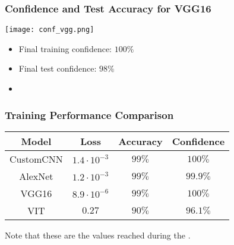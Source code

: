 \documentclass[../presentation.tex]{subfiles} %
\begin{document}
\begin{frame}
    \frametitle{Confidence and Test Accuracy for VGG16}
    \begin{center}
        \texttt{[image: conf\_vgg.png]}
    \end{center}

    \small{
    \begin{cbox}
        \begin{itemize}
            \item Final training confidence: $100\%$
            \item Final test confidence: $98\%$
            \item {}
        \end{itemize}
    \end{cbox}
    }
\end{frame}

\begin{frame}
    \frametitle{Training Performance Comparison}


		\begin{table}[htb]
			\renewcommand{\arraystretch}{1.5} %
			\centering
			\begin{tabular}{|c|c|c|c|}

				\hline
				\rowcolor{boxcolor}
				\textbf{Model} &
				\textbf{Loss} &
				\textbf{Accuracy} &
				\textbf{Confidence} \\

				\hline
				CustomCNN & $1.4 \cdot 10^{-3}$ & $99\%$ & $100\%$ \\
				AlexNet & $1.2 \cdot 10^{-3}$ & $99\%$ & $99.9\%$ \\
				VGG16 & $8.9 \cdot 10^{-6}$ & $99\%$ & $100\%$ \\
				VIT & $0.27$ & $90\%$ & $96.1\%$ \\
				\hline

			\end{tabular}
			\renewcommand{\arraystretch}{1} %
		\end{table}

    \begin{warning}
			Note that these are the values reached during the .
    \end{warning}

\end{frame}
\end{document}
